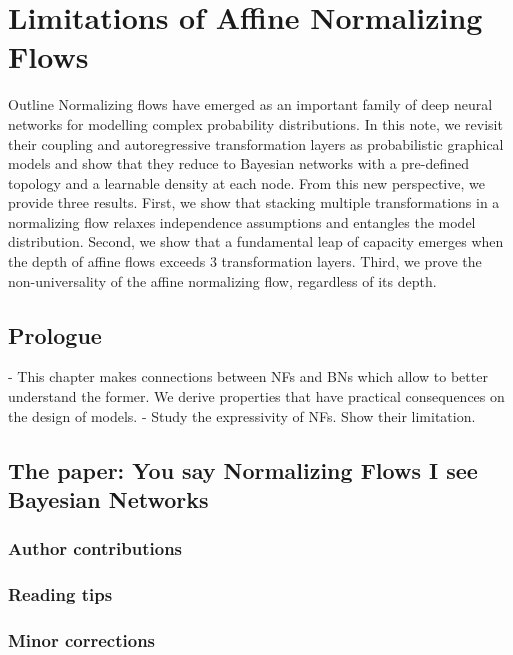 \chapter{Limitations of Affine Normalizing Flows}\label{ch:04}

\begin{remark}{Outline}
Normalizing flows have emerged as an important family of deep neural networks for modelling complex probability distributions.
In this note, we revisit their coupling and autoregressive transformation layers as probabilistic graphical models and show that they reduce to Bayesian networks  with a pre-defined topology and a learnable density at each node.
From this new perspective, we provide three results.
First, we show that stacking multiple transformations in a normalizing flow relaxes independence assumptions and entangles the model distribution.
Second, we show that a fundamental leap of capacity emerges when the depth of affine flows exceeds 3 transformation layers.
Third, we prove the non-universality of the affine normalizing flow, regardless of its depth.
\end{remark}

\section{Prologue}
- This chapter makes connections between NFs and BNs which allow to better understand  the former. We derive properties that have practical consequences on the design of models.
- Study the expressivity of NFs. Show their limitation. 
\section{The paper: You say Normalizing Flows I see Bayesian Networks}

\subsection{Author contributions}

\subsection{Reading tips}

\subsection{Minor corrections}


